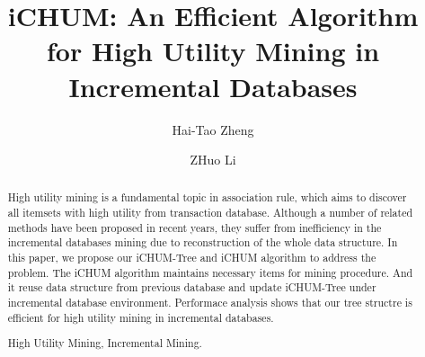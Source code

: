 \documentclass[runningheads,a4paper]{llncs}
\newcommand{\keywords}[1]{\par\addvspace\baselineskip
\noindent\keywordname\enspace\ignorespaces#1}
\begin{document}
\mainmatter %

\title{iCHUM: An Efficient Algorithm for High Utility Mining in Incremental Databases}


%
%
\author{Hai-Tao Zheng%
\and ZHuo Li}
%



%
%

\maketitle


\begin{abstract}
High utility mining is a fundamental topic in association rule, which aims to discover all itemsets with high utility from transaction database. Although a number of related methods have been proposed in recent years, they suffer from inefficiency in the incremental databases mining due to reconstruction of the whole data structure. In this paper, we propose our iCHUM-Tree and iCHUM algorithm to address the problem. The iCHUM algorithm maintains necessary items for mining procedure. And it reuse data structure from previous database and update iCHUM-Tree under incremental database environment. Performace analysis shows that our tree structre is efficient for high utility mining in incremental databases.
\keywords{High Utility Mining, Incremental Mining.}
\end{abstract}
\end{document}
